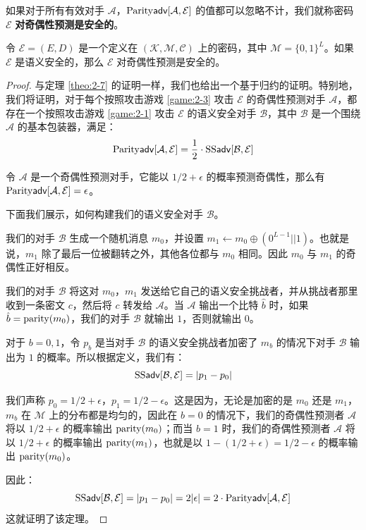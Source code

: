 \begin{definition}[奇偶性预测]
如果对于所有有效对手 $\mathcal{A}$，${\rm Parity\mathsf{adv}}[\mathcal{A},\mathcal{E}]$ 的值都可以忽略不计，我们就称密码 $\mathcal{E}$ \textbf{对奇偶性预测是安全的}。
\end{definition}

\begin{theorem}
令 $\mathcal{E}=(E,D)$ 是一个定义在 $(\mathcal{K},\mathcal{M},\mathcal{C})$ 上的密码，其中 $\mathcal{M}=\{0,1\}^L$。如果 $\mathcal{E}$ 是语义安全的，那么 $\mathcal{E}$ 对奇偶性预测是安全的。
\end{theorem}

\begin{proof}
与定理 \ref{theo:2-7} 的证明一样，我们也给出一个基于归约的证明。特别地，我们将证明，对于每个按照攻击游戏 \ref{game:2-3} 攻击 $\mathcal{E}$ 的奇偶性预测对手 $\mathcal{A}$，都存在一个按照攻击游戏 \ref{game:2-1} 攻击 $\mathcal{E}$ 的语义安全对手 $\mathcal{B}$，其中 $\mathcal{B}$ 是一个围绕 $\mathcal{A}$ 的基本包装器，满足：
$$
{\rm Parity\mathsf{adv}}[\mathcal{A},\mathcal{E}]=\frac{1}{2}\cdot{\rm SS\mathsf{adv}}[\mathcal{B},\mathcal{E}]
$$

令 $\mathcal{A}$ 是一个奇偶性预测对手，它能以 ${1}/{2}+\epsilon$ 的概率预测奇偶性，那么有 ${\rm Parity\mathsf{adv}}[\mathcal{A},\mathcal{E}]=\epsilon$。

下面我们展示，如何构建我们的语义安全对手 $\mathcal{B}$。

我们的对手 $\mathcal{B}$ 生成一个随机消息 $m_0$，并设置 $m_1\leftarrow m_0\oplus(0^{L-1}||1)$。也就是说，$m_1$ 除了最后一位被翻转之外，其他各位都与 $m_0$ 相同。因此 $m_0$ 与 $m_1$ 的奇偶性正好相反。

我们的对手 $\mathcal{B}$ 将这对 $m_0$，$m_1$ 发送给它自己的语义安全挑战者，并从挑战者那里收到一条密文 $c$，然后将 $c$ 转发给 $\mathcal{A}$。当 $\mathcal{A}$ 输出一个比特 $\hat b$ 时，如果 $\hat b={\rm parity}(m_0)$，我们的对手 $\mathcal{B}$ 就输出 $1$，否则就输出 $0$。

对于 $b=0,1$，令 $p_b$ 是当对手 $\mathcal{B}$ 的语义安全挑战者加密了 $m_b$ 的情况下对手 $\mathcal{B}$ 输出为 $1$ 的概率。所以根据定义，我们有：
$$
{\rm SS\mathsf{adv}}[\mathcal{B},\mathcal{E}]=|p_1-p_0|
$$

我们声称 $p_0={1}/{2}+\epsilon$，$p_1={1}/{2}-\epsilon$。这是因为，无论是加密的是 $m_0$ 还是 $m_1$，$m_b$ 在 $\mathcal{M}$ 上的分布都是均匀的，因此在 $b=0$ 的情况下，我们的奇偶性预测者 $\mathcal{A}$ 将以 ${1}/{2}+\epsilon$ 的概率输出 ${\rm parity}(m_0)$；而当 $b=1$ 时，我们的奇偶性预测者 $\mathcal{A}$ 将以 ${1}/{2}+\epsilon$ 的概率输出 ${\rm parity}(m_1)$，也就是以 $1-({1}/{2}+\epsilon)={1}/{2}-\epsilon$ 的概率输出 ${\rm parity}(m_0)$。

因此：
$$
{\rm SS\mathsf{adv}}[\mathcal{B},\mathcal{E}]=|p_1-p_0|=2|\epsilon|=2\cdot{\rm Parity\mathsf{adv}}[\mathcal{A},\mathcal{E}]
$$
这就证明了该定理。
\end{proof}


